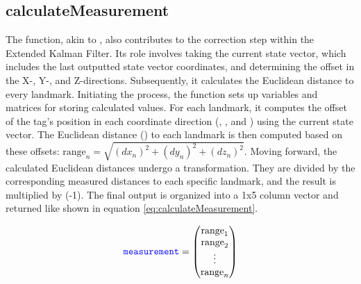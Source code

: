 \subsection{calculateMeasurement}
\label{sub:calculateMeasurement}
The  function, akin to , also contributes to the correction step within the Extended Kalman Filter. 
Its role involves taking the current state vector, which includes the last outputted state vector coordinates, and determining the offset in the X-, Y-, and Z-directions. Subsequently, it calculates the Euclidean distance to every landmark.
\vspace{4pt}
\newline
Initiating the process, the function sets up variables and matrices for storing calculated values. For each landmark, it computes the offset of the tag's position in each coordinate direction (, , and ) using the current state vector. The Euclidean distance () to each landmark is then computed based on these offsets:
$\textrm{range}_n = \sqrt{(dx_n)^2 + (dy_n)^2 + (dz_n)^2}$.
Moving forward, the calculated Euclidean distances undergo a transformation. They are divided by the corresponding measured distances to each specific landmark, and the result is multiplied by (-1). The final output is organized into a 1x5 column vector and returned like shown in equation \ref{eq:calculateMeasurement}. 

\begin{equation}
\begin{centering}
	\blueconsolas{measurement} =
	\begin{pmatrix}
		\textrm{range}_1 \\
		\textrm{range}_2 \\
		\vdots \\
		\textrm{range}_n 
	\end{pmatrix}
\end{centering}
\label{eq:calculateMeasurement}
\end{equation}
